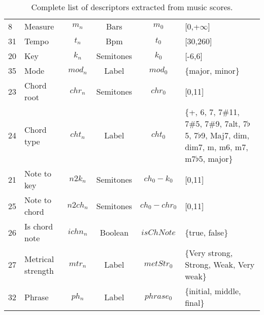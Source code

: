 \begin{table}
{\begin{tabular}{l l c c c p{2.5cm} }
    8 & Measure & $m_n$ & Bars & $m_0$ & [0,+$\infty$] \\
    31 & Tempo & $t_n$ & Bpm & $t_0$ & [30,260] \\
    20 & Key & $k_n$ & Semitones & $k_0$ & [-6,6] \\
 	35 & Mode & $mod_n$ & Label & $mod_0$ & \{major, minor\} \\
 	23 & Chord root & $chr_n$ & Semitones & $chr_0$ & [0,11] \\
    24 & Chord type & $cht_n$ & Label & $cht_0$  & \{+, 6, 7, 7\#11, 7\#5, 7\#9, 7alt, 7$\flat$5, 7$\flat$9, Maj7, dim, dim7, m, m6, m7, m7$\flat$5, major\} \\
    21 & Note to key & $n2k_n$ & Semitones & $ch_0-k_0$ & [0,11] \\
	25 & Note to chord & $n2ch_n$ & Semitones & $ch_0-chr_0$ & [0,11] \\
 	26 & Is chord note & $ichn_n$ & Boolean & $isChNote$ & \{true, false\} \\
 	27 & Metrical strength & $mtr_n$ & Label & $metStr_0$ & \{Very strong, Strong, Weak, Very weak\} \\
 	32 & Phrase & $ph_n$ & Label & $phrase_0$ & \{initial, middle, final\} \\
 

    \hline

  \end{tabular}
  }
  
   \caption[Complete list of descriptors extracted from music scores.]{Complete list of descriptors extracted from music scores.}
  \label{tab:note_descriptors}
\end{table}
